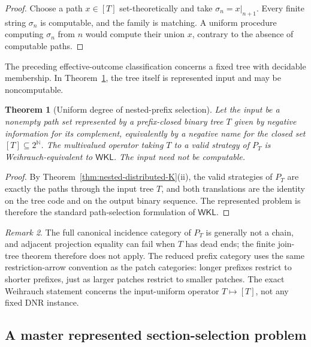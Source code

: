 \documentclass[11pt]{article}
\theoremstyle{plain}
\newtheorem{theorem}{Theorem}[section]
\theoremstyle{definition}
\theoremstyle{remark}
\newtheorem{remark}[theorem]{Remark}
\newcommand{\N}{\mathbb{N}}
\begin{document}
\begin{proof}
Choose a path $x\in[T]$ set-theoretically and take
$\sigma_n=x|_{n+1}$. Every finite string $\sigma_n$ is computable, and the
family is matching. A uniform procedure computing $\sigma_n$ from $n$ would
compute their union $x$, contrary to the absence of computable paths.
\end{proof}

The preceding effective-outcome classification concerns a fixed tree with
decidable membership. In Theorem~\ref{thm:nested-WKL}, the tree itself is
represented input and may be noncomputable.

\begin{theorem}[Uniform degree of nested-prefix selection]
\label{thm:nested-WKL}
Let the input be a nonempty path set represented by a prefix-closed binary tree
$T$ given by negative information for its complement, equivalently by a negative
name for the closed set $[T]\subseteq2^\N$. The multivalued operator taking $T$
to a valid strategy of $P_T$ is Weihrauch-equivalent to $\mathsf{WKL}$. The
input need not be computable.
\end{theorem}

\begin{proof}
By Theorem~\ref{thm:nested-distributed-K}(ii), the valid strategies of $P_T$ are
exactly the paths through the input tree $T$, and both translations are the
identity on the tree code and on the output binary sequence. The represented
problem is therefore the standard path-selection formulation of
$\mathsf{WKL}$.
\end{proof}

\begin{remark}
The full canonical incidence category of $P_T$ is generally not a chain, and adjacent
projection equality can fail when $T$ has dead ends; the finite join-tree
theorem therefore does not apply. The reduced prefix category uses the same
restriction-arrow convention as the patch categories: longer prefixes restrict to
shorter prefixes, just as larger patches restrict to smaller patches. The exact
Weihrauch statement concerns the input-uniform operator $T\mapsto[T]$, not any
fixed DNR instance.
\end{remark}

\subsection{A master represented section-selection problem}
\label{subsec:master-weihrauch-section}
\end{document}
